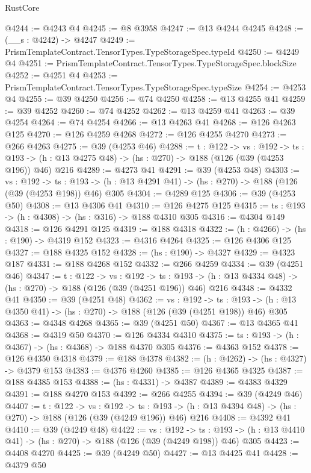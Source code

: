 \begin{lexlean}{RustCore}
\begin{coremodule}
@4244 := @4243 @4
@4245 := @8 @3958
@4247 := @13 @4244 @4245
@4248 := (__s : @4242) -> @4247
@4249 := PrismTemplateContract.TensorTypes.TypeStorageSpec.typeId
@4250 := @4249 @4
@4251 := PrismTemplateContract.TensorTypes.TypeStorageSpec.blockSize
@4252 := @4251 @4
@4253 := PrismTemplateContract.TensorTypes.TypeStorageSpec.typeSize
@4254 := @4253 @4
@4255 := @39 @4250
@4256 := @74 @4250
@4258 := @13 @4255 @41
@4259 := @39 @4252
@4260 := @74 @4252
@4262 := @13 @4259 @41
@4263 := @39 @4254
@4264 := @74 @4254
@4266 := @13 @4263 @41
@4268 := @126 @4263 @125
@4270 := @126 @4259 @4268
@4272 := @126 @4255 @4270
@4273 := @266 @4263
@4275 := @39 (@4253 @46)
@4288 := {t : @122} ->
  {vs : @192} ->
  {ts : @193} -> (h : @13 @4275 @48) -> (hs : @270) -> @188 (@126 (@39 (@4253 @196)) @46) @216
@4289 := @4273 @41
@4291 := @39 (@4253 @48)
@4303 := {vs : @192} ->
  {ts : @193} -> (h : @13 @4291 @41) -> (hs : @270) -> @188 (@126 (@39 (@4253 @198)) @46) @305
@4304 := @4289 @125
@4306 := @39 (@4253 @50)
@4308 := @13 @4306 @41
@4310 := @126 @4275 @125
@4315 := {ts : @193} -> (h : @4308) -> (hs : @316) -> @188 @4310 @305
@4316 := @4304 @149
@4318 := @126 @4291 @125
@4319 := @188 @4318
@4322 := (h : @4266) -> (hs : @190) -> @4319 @152
@4323 := @4316 @4264
@4325 := @126 @4306 @125
@4327 := @188 @4325 @152
@4328 := (hs : @190) -> @4327
@4329 := @4323 @187
@4331 := @188 @4268 @152
@4332 := @266 @4259
@4334 := @39 (@4251 @46)
@4347 := {t : @122} ->
  {vs : @192} ->
  {ts : @193} -> (h : @13 @4334 @48) -> (hs : @270) -> @188 (@126 (@39 (@4251 @196)) @46) @216
@4348 := @4332 @41
@4350 := @39 (@4251 @48)
@4362 := {vs : @192} ->
  {ts : @193} -> (h : @13 @4350 @41) -> (hs : @270) -> @188 (@126 (@39 (@4251 @198)) @46) @305
@4363 := @4348 @4268
@4365 := @39 (@4251 @50)
@4367 := @13 @4365 @41
@4368 := @4319 @50
@4370 := @126 @4334 @4310
@4375 := {ts : @193} -> (h : @4367) -> (hs : @4368) -> @188 @4370 @305
@4376 := @4363 @152
@4378 := @126 @4350 @4318
@4379 := @188 @4378
@4382 := (h : @4262) -> (hs : @4327) -> @4379 @153
@4383 := @4376 @4260
@4385 := @126 @4365 @4325
@4387 := @188 @4385 @153
@4388 := (hs : @4331) -> @4387
@4389 := @4383 @4329
@4391 := @188 @4270 @153
@4392 := @266 @4255
@4394 := @39 (@4249 @46)
@4407 := {t : @122} ->
  {vs : @192} ->
  {ts : @193} -> (h : @13 @4394 @48) -> (hs : @270) -> @188 (@126 (@39 (@4249 @196)) @46) @216
@4408 := @4392 @41
@4410 := @39 (@4249 @48)
@4422 := {vs : @192} ->
  {ts : @193} -> (h : @13 @4410 @41) -> (hs : @270) -> @188 (@126 (@39 (@4249 @198)) @46) @305
@4423 := @4408 @4270
@4425 := @39 (@4249 @50)
@4427 := @13 @4425 @41
@4428 := @4379 @50

\end{coremodule}
\end{lexlean}
